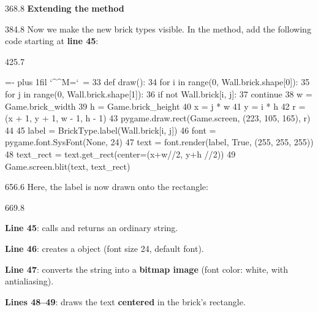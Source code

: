\documentclass{aslab}
\makeatletter
\newcommand*\kw[1]{\textcolor{codeorange}{#1}}
\newcommand*\fn[1]{\textcolor{codecyan}{#1}}
\newcommand*\num[1]{\textcolor{codered}{#1}}
\newenvironment{pycode}{\par\ttfamily\hyphenchar\font=-1
  \lineskiplimit=-\maxdimen\lineskip=0pt\parindent=0pt
  \parfillskip=0pt plus 1fil\relax
  \catcode`\^^M=\active\catcode`\ =\active\py@setup\py@gobble}{}
\newcommand*\emo[1]{\makebox[18bp][l]{\emoji{#1}}}
\makeatother
\begin{document}
\begin{region}{368.8}
\emo{1F5BC}\textbf{Extending the}  \textbf{method}
\end{region}

\begin{region}[pitch=14.2]{384.8}
Now we make the new brick types visible. In the  method, add the
following code starting at \textbf{line 45}:
\end{region}

\begin{region}[]{425.7}
\begin{pycode}
\kw{33}     \kw{def} \fn{draw}():
\kw{34}         \kw{for} i \kw{in} \fn{range}(\num{0}, Wall.brick.shape[\num{0}]):
\kw{35}             \kw{for} j \kw{in} \fn{range}(\num{0}, Wall.brick.shape[\num{1}]):
\kw{36}                 \kw{if} \kw{not} Wall.brick[i, j]:
\kw{37}                     \kw{continue}
\kw{38}                 w = Game.brick\_width
\kw{39}                 h = Game.brick\_height
\kw{40}                 x = j * w
\kw{41}                 y = i * h
\kw{42}                 r = (x + \num{1}, y + \num{1}, w - \num{1}, h - \num{1})
\kw{43}                 pygame.draw.rect(Game.screen, (\num{223}, \num{105}, \num{165}), r)
\kw{44}
\kw{45}                 label = BrickType.label(Wall.brick[i, j])
\kw{46}                 font = pygame.font.SysFont(\fn{None}, \num{24})
\kw{47}                 text = font.render(label, \fn{True}, (\num{255}, \num{255}, \num{255}))
\kw{48}                 text\_rect = text.get\_rect(center=(x+w//\num{2}, y+h //\num{2}))
\kw{49}                 Game.screen.blit(text, text\_rect)
\end{pycode}
\end{region}

\begin{region}{656.6}
Here, the label is now drawn onto the rectangle:
\end{region}

\begin{region}[pitch=14.27]{669.8}
\begin{dashlist}
\item \textbf{Line 45}: calls  and returns an
  ordinary string.
\item \textbf{Line 46}: creates a  object (font size 24, default
  font).
\item \textbf{Line 47}: converts the string into a \textbf{bitmap image}
  (font color: white, with antialiasing).
\item \textbf{Lines 48--49}: draws the text \textbf{centered} in the brick's
  rectangle.
\end{dashlist}
\end{region}
\end{document}
